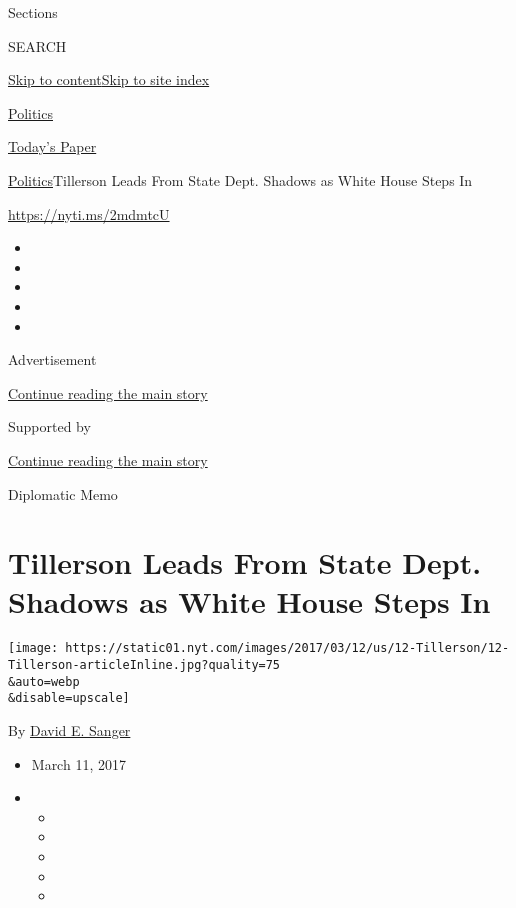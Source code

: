Sections

SEARCH

\protect\hyperlink{site-content}{Skip to
content}\protect\hyperlink{site-index}{Skip to site index}

\href{https://www.nytimes.com/section/politics}{Politics}

\href{https://myaccount.nytimes.com/auth/login?response_type=cookie\&client_id=vi}{}

\href{https://www.nytimes.com/section/todayspaper}{Today's Paper}

\href{/section/politics}{Politics}\textbar{}Tillerson Leads From State
Dept. Shadows as White House Steps In

\url{https://nyti.ms/2mdmtcU}

\begin{itemize}
\item
\item
\item
\item
\item
\end{itemize}

Advertisement

\protect\hyperlink{after-top}{Continue reading the main story}

Supported by

\protect\hyperlink{after-sponsor}{Continue reading the main story}

Diplomatic Memo

\hypertarget{tillerson-leads-from-state-dept-shadows-as-white-house-steps-in}{%
\section{Tillerson Leads From State Dept. Shadows as White House Steps
In}\label{tillerson-leads-from-state-dept-shadows-as-white-house-steps-in}}

\texttt{[image: https://static01.nyt.com/images/2017/03/12/us/12-Tillerson/12-Tillerson-articleInline.jpg?quality=75\\\&auto=webp\\\&disable=upscale]}

By \href{http://www.nytimes.com/by/david-e-sanger}{David E. Sanger}

\begin{itemize}
\item
  March 11, 2017
\item
  \begin{itemize}
  \item
  \item
  \item
  \item
  \item
  \end{itemize}
\end{itemize}

